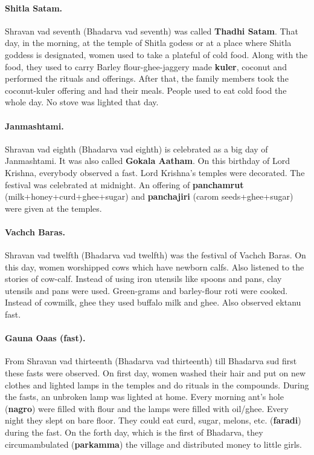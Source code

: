 \paragraph{Shitla Satam.} Shravan vad seventh (Bhadarva vad seventh) was called
\textbf{Thadhi Satam}. That day, in the morning, at the temple of Shitla godess
or at a place where Shitla goddess is designated, women used to take a plateful
of cold food. Along with the food, they used to carry Barley flour-ghee-jaggery
made \textbf{kuler}, coconut and performed the rituals and offerings. After
that, the family members took the coconut-kuler offering and had their meals.
People used to eat cold food the whole day. No stove was lighted that day.  
\paragraph{Janmashtami.} Shravan vad eighth (Bhadarva vad eighth) is celebrated
as a big day of Janmashtami. It was also called \textbf{Gokala Aatham}. On this
birthday of Lord Krishna, everybody observed a fast. Lord Krishna's temples were
decorated. The festival was celebrated at midnight. An offering of
\textbf{panchamrut} (milk+honey+curd+ghee+sugar) and \textbf{panchajiri} (carom
seeds+ghee+sugar) were given at the temples.
\paragraph{Vachch Baras.} Shravan vad twelfth (Bhadarva vad twelfth) was the
festival of Vachch Baras. On this day, women worshipped cows which have newborn
calfs. Also listened to the stories of cow-calf. Instead of using iron utensils
like spoons and pans, clay utensils and pans were used. Green-grams and
barley-flour roti were cooked. Instead of cowmilk, ghee they used buffalo milk
and ghee. Also observed ektanu fast.
\paragraph{Gauna Oaas (fast).} From Shravan vad thirteenth (Bhadarva vad
thirteenth) till Bhadarva sud first these fasts were observed. On first day,
women washed their hair and put on new clothes and lighted lamps in the temples
and do rituals in the compounds. During the fasts, an unbroken lamp was lighted
at home. Every morning ant's hole (\textbf{nagro}) were filled with flour and
the lamps were filled with oil/ghee. Every night they slept on bare floor. They
could eat curd, sugar, melons, etc. (\textbf{faradi}) during the fast. On the
forth day, which is the first of Bhadarva, they circumambulated
(\textbf{parkamma}) the village and distributed money to little girls.
